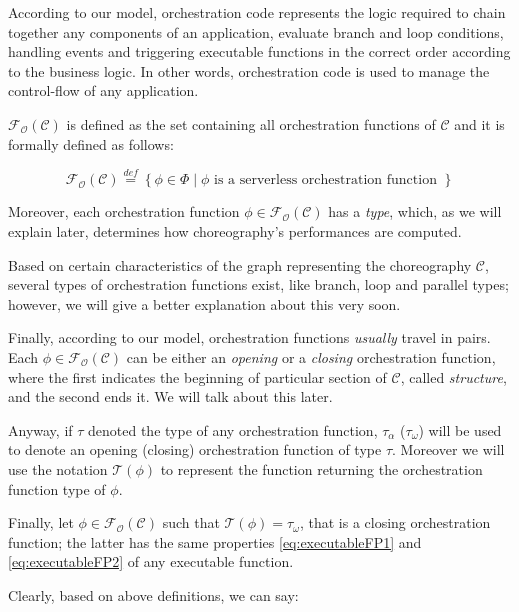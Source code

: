 \documentclass[12pt,a4paper]{report}
\newcommand{\mathDef}{\overset{\textit{def}}{=}}
\begin{document}
\begin{itemize}
	According to our model, orchestration code represents the logic required to chain together any components of an application, evaluate branch and loop conditions, handling events and triggering executable functions in the correct order according to the business logic. In other words, orchestration code is used to manage the control-flow of any application.
	
	$\mathscr{F_O}(\mathcal{C})$ is defined as the set containing all orchestration functions of $\mathcal{C}$ and it is formally defined as follows:
	
	\begin{equation}
		\mathscr{F_O}(\mathcal{C}) \mathDef \left\lbrace \phi \in \Phi \mid \phi \text{ is a serverless orchestration function }\right\rbrace 
	\end{equation}

	Moreover, each orchestration function $\phi \in \mathscr{F_O}(\mathcal{C})$ has a \textit{type}, which, as we will explain later, determines how choreography's performances are computed. 
	
	Based on certain characteristics of the graph representing the choreography $\mathcal{C}$, several types of orchestration functions exist, like branch, loop and parallel types; however, we will give a better explanation about this very soon.

	Finally, according to our model, orchestration functions \textit{usually} travel in pairs. Each $\phi \in \mathscr{F_O}(\mathcal{C})$ can be either an \textit{opening} or a \textit{closing} orchestration function, where the first indicates the beginning of particular section of $\mathcal{C}$, called \textit{structure}, and the second ends it.	We will talk about this later.
	
	Anyway, if $\tau$ denoted the type of any orchestration function, $\tau_{\alpha}$ ($\tau_{\omega}$) will be used to denote an opening (closing) orchestration function of type $\tau$. Moreover we will use the notation $\mathscr{T}(\phi)$ to represent the function returning the orchestration function type of $\phi$.
	
	Finally, let $\phi \in \mathscr{F_O}(\mathcal{C})$ such that $\mathscr{T}(\phi) = \tau_{\omega}$, that is a closing orchestration function; the latter has the same properties \ref{eq:executableFP1} and \ref{eq:executableFP2} of any executable function.
	
\end{itemize}

Clearly, based on above definitions, we can say: 
\end{document}

